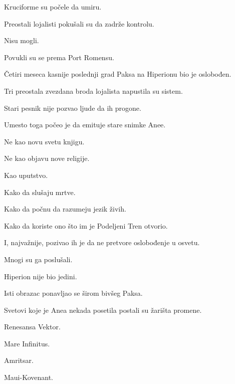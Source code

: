 \bigskip

Kruciforme su počele da umiru.

\bigskip

Preostali lojalisti pokušali su da zadrže kontrolu.

\bigskip

Nisu mogli.

\bigskip

Povukli su se prema Port Romensu.

\bigskip

Četiri meseca kasnije poslednji grad Paksa na Hiperionu bio je oslobođen.

\bigskip

Tri preostala zvezdana broda lojalista napustila su sistem.

\bigskip

Stari pesnik nije pozvao ljude da ih progone.

\bigskip

Umesto toga počeo je da emituje stare snimke Anee.

\bigskip

Ne kao novu svetu knjigu.

Ne kao objavu nove religije.

\bigskip

Kao uputstvo.

\bigskip

Kako da slušaju mrtve.

Kako da počnu da razumeju jezik živih.

Kako da koriste ono što im je Podeljeni Tren otvorio.

\bigskip

I, najvažnije, pozivao ih je da ne pretvore oslobođenje u osvetu.

\bigskip

Mnogi su ga poslušali.

\bigskip

Hiperion nije bio jedini.

\bigskip

Isti obrazac ponavljao se širom bivšeg Paksa.

\bigskip

Svetovi koje je Anea nekada posetila postali su žarišta promene.

\bigskip

Renesansa Vektor.

Mare Infinitus.

Amritsar.

Maui-Kovenant.

